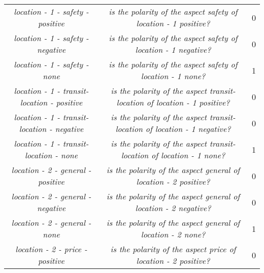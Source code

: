 {{\begin{center}
{\begin{tabular}{|c|c|c|}
		\textit{{\color{black} location - 1} - {\color{orange} safety} - {\color{green} positive}} & \textit{is the polarity of the aspect {\color{orange} safety} of {\color{black} location - 1} {\color{green} positive}?} & 0 \\
		\textit{{\color{black} location - 1} - {\color{orange} safety} - {\color{red} negative}} & \textit{is the polarity of the aspect {\color{orange} safety} of {\color{black} location - 1} {\color{red} negative}?} & 0 \\
		\textit{{\color{black} location - 1} - {\color{orange} safety} - {\color{gray} none}} & \textit{is the polarity of the aspect {\color{orange} safety} of {\color{black} location - 1} {\color{gray} none}?} & 1 \\
		\hline \hline
		\textit{{\color{black} location - 1} - {\color{pink} transit-location} - {\color{green} positive}} & \textit{is the polarity of the aspect {\color{pink} transit-location} of {\color{black} location - 1} {\color{green} positive}?} & 0 \\
		\textit{{\color{black} location - 1} - {\color{pink} transit-location} - {\color{red} negative}} & \textit{is the polarity of the aspect {\color{pink} transit-location} of {\color{black} location - 1} {\color{red} negative}?} & 0 \\
		\textit{{\color{black} location - 1} - {\color{pink} transit-location} - {\color{gray} none}} & \textit{is the polarity of the aspect {\color{pink} transit-location} of {\color{black} location - 1} {\color{gray} none}?} & 1 \\
		\hline \hline
		\textit{{\color{black} location - 2} - {\color{purple} general} - {\color{green} positive}} & \textit{is the polarity of the aspect {\color{purple} general} of {\color{black} location - 2} {\color{green} positive}?} & 0 \\
		\textit{{\color{black} location - 2} - {\color{purple} general} - {\color{red} negative}} & \textit{is the polarity of the aspect {\color{purple} general} of {\color{black} location - 2} {\color{red} negative}?} & 0 \\
		\textit{{\color{black} location - 2} - {\color{purple} general} - {\color{gray} none}} & \textit{is the polarity of the aspect {\color{purple} general} of {\color{black} location - 2} {\color{gray} none}?} & 1 \\
		\hline \hline
		\textit{{\color{black} location - 2} - {\color{cyan} price} - {\color{green} positive}} & \textit{is the polarity of the aspect {\color{cyan} price} of {\color{black} location - 2} {\color{green} positive}?} & 0 \\

\end{tabular}}
\end{center}}}
